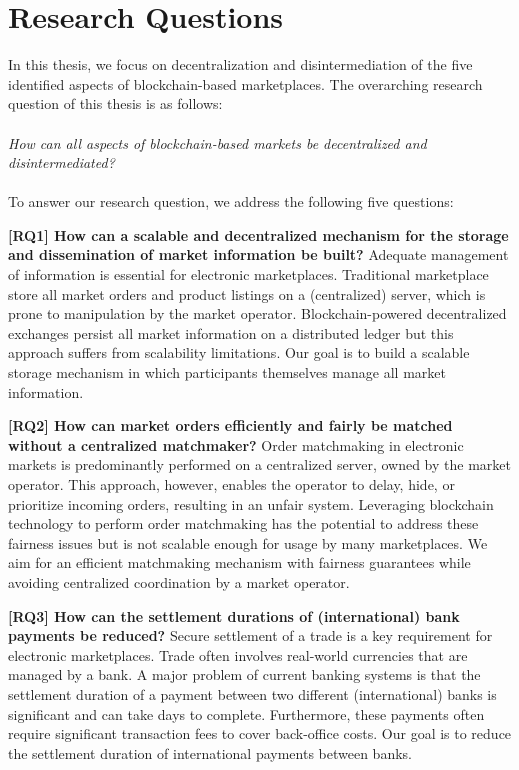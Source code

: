 \section{Research Questions}
\label{sec:research_questions}
In this thesis, we focus on decentralization and disintermediation of the five identified aspects of blockchain-based marketplaces.
The overarching research question of this thesis is as follows:\\\\
\emph{How can all aspects of blockchain-based markets be decentralized and disintermediated?}\\\\
To answer our research question, we address the following five questions:

\textbf{[RQ1] How can a scalable and decentralized mechanism for the storage and dissemination of market information be built?}
Adequate management of information is essential for electronic marketplaces.
Traditional marketplace store all market orders and product listings on a (centralized) server, which is prone to manipulation by the market operator.
Blockchain-powered decentralized exchanges persist all market information on a distributed ledger but this approach suffers from scalability limitations.
Our goal is to build a scalable storage mechanism in which participants themselves manage all market information.

\textbf{[RQ2] How can market orders efficiently and fairly be matched without a centralized matchmaker?}
Order matchmaking in electronic markets is predominantly performed on a centralized server, owned by the market operator.
This approach, however, enables the operator to delay, hide, or prioritize incoming orders, resulting in an unfair system.
Leveraging blockchain technology to perform order matchmaking has the potential to address these fairness issues but is not scalable enough for usage by many marketplaces.
We aim for an efficient matchmaking mechanism with fairness guarantees while avoiding centralized coordination by a market operator.

\textbf{[RQ3] How can the settlement durations of (international) bank payments be reduced?}
Secure settlement of a trade is a key requirement for electronic marketplaces.
Trade often involves real-world currencies that are managed by a bank.
A major problem of current banking systems is that the settlement duration of a payment between two different (international) banks is significant and can take days to complete.
Furthermore, these payments often require significant transaction fees to cover back-office costs.
Our goal is to reduce the settlement duration of international payments between banks.

